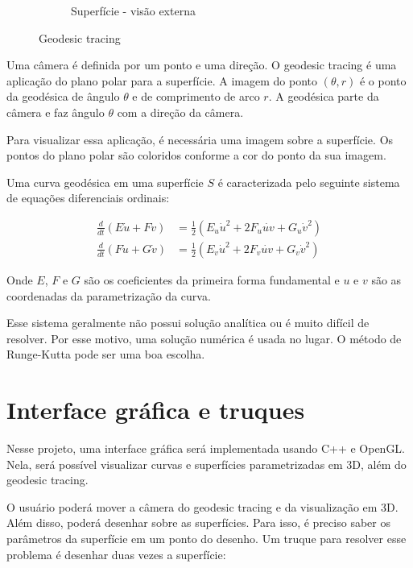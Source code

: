 \documentclass[10pt,a4paper]{article}
\begin{document}
\begin{figure}[h!]
\begin{subfigure}{0.4\linewidth}
\caption{Superfície - visão externa}
\end{subfigure}
\caption{Geodesic tracing}
\end{figure}

Uma câmera é definida por um ponto e uma direção.
O geodesic tracing é uma aplicação do plano polar para a superfície.
A imagem do ponto $(\theta, r)$ é o ponto da geodésica de ângulo $\theta$ e de comprimento de arco $r$.
A geodésica parte da câmera e faz ângulo $\theta$ com a direção da câmera.

Para visualizar essa aplicação, é necessária uma imagem sobre a superfície.
Os pontos do plano polar são coloridos conforme a cor do ponto da sua imagem.

Uma curva geodésica em uma superfície $S$ é caracterizada pelo seguinte sistema de equações diferenciais ordinais:

\begin{align*}
\frac{d}{dt}(E\dot{u}+F\dot{v}) &= \frac{1}{2}(E_u\dot{u}^2 + 2F_u\dot{uv} + G_u\dot{v}^2)\\
\frac{d}{dt}(F\dot{u}+G\dot{v}) &= \frac{1}{2}(E_v\dot{u}^2 + 2F_v\dot{uv} + G_v\dot{v}^2)
\end{align*}

Onde $E$, $F$ e $G$ são os coeficientes da primeira forma fundamental
e $u$ e $v$ são as coordenadas da parametrização da curva.

Esse sistema geralmente não possui solução analítica ou é muito difícil de resolver.
Por esse motivo, uma solução numérica é usada no lugar. O método de Runge-Kutta pode ser uma boa escolha.

\section*{Interface gráfica e truques}
Nesse projeto, uma interface gráfica será implementada usando C++ e OpenGL.
Nela, será possível visualizar curvas e superfícies parametrizadas em 3D, além do geodesic tracing.

O usuário poderá mover a câmera do geodesic tracing e da visualização em 3D.
Além disso, poderá desenhar sobre as superfícies.
Para isso, é preciso saber os parâmetros da superfície em um ponto do desenho.
Um truque para resolver esse problema é desenhar duas vezes a superfície:
\end{document}
